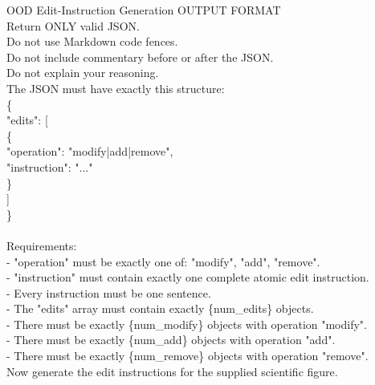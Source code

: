 \begin{PromptBox}{OOD Edit-Instruction Generation}
OUTPUT FORMAT \\
Return ONLY valid JSON. \\
Do not use Markdown code fences. \\
Do not include commentary before or after the JSON. \\
Do not explain your reasoning. \\

The JSON must have exactly this structure: \\
{\ttfamily
\{ \\
\hspace*{1.5em}"edits": [ \\
\hspace*{3em}\{ \\
\hspace*{4.5em}"operation": "modify|add|remove", \\
\hspace*{4.5em}"instruction": "..." \\
\hspace*{3em}\} \\
\hspace*{1.5em}] \\
\} \\
}\\
Requirements: \\
- "operation" must be exactly one of: "modify", "add", "remove". \\
- "instruction" must contain exactly one complete atomic edit instruction. \\
- Every instruction must be one sentence. \\
- The "edits" array must contain exactly \{num\_edits\} objects. \\
- There must be exactly \{num\_modify\} objects with operation "modify". \\
- There must be exactly \{num\_add\} objects with operation "add". \\
- There must be exactly \{num\_remove\} objects with operation "remove". \\

Now generate the edit instructions for the supplied scientific figure.
\label{fig:prompt_synthetic}
\end{PromptBox}
